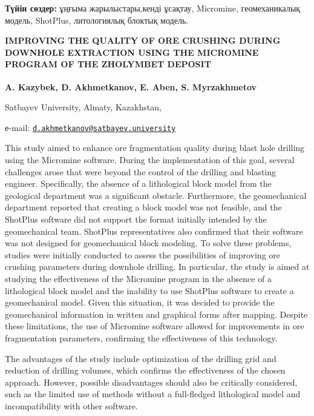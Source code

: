 {\bfseries Түйін сөздер:} ұңғыма жарылыстары,кенді ұсақтау, Micromine,
геомеханикалық модель, ShotPlus, литологиялық блоктық модель.
\begin{articleheader}

{\bfseries IMPROVING THE QUALITY OF ORE CRUSHING DURING DOWNHOLE EXTRACTION
USING THE MICROMINE PROGRAM OF THE ZHOLYMBET DEPOSIT}

{\bfseries A. Kazybek, D. Akhmetkanov\textsuperscript{\envelope }, E. Aben, S.
Myrzakhmetov}
\end{articleheader}
\begin{affiliation}

Satbayev University, Almaty, Kazakhstan,

е-mail: \href{mailto:d.akhmetkanov@satbayev.university}{\nolinkurl{d.akhmetkanov@satbayev.university}}
\end{affiliation}

This study aimed to enhance ore fragmentation quality during blast hole
drilling using the Micromine software. During the implementation of this
goal, several challenges arose that were beyond the control of the
drilling and blasting engineer. Specifically, the absence of a
lithological block model from the geological department was a
significant obstacle. Furthermore, the geomechanical department reported
that creating a block model was not feasible, and the ShotPlus software
did not support the format initially intended by the geomechanical team.
ShotPlus representatives also confirmed that their software was not
designed for geomechanical block modeling. To solve these problems,
studies were initially conducted to assess the possibilities of
improving ore crushing parameters during downhole drilling. In
particular, the study is aimed at studying the effectiveness of the
Micromine program in the absence of a lithological block model and the
inability to use ShotPlus software to create a geomechanical model.
Given this situation, it was decided to provide the geomechanical
information in written and graphical forms after mapping. Despite these
limitations, the use of Micromine software allowed for improvements in
ore fragmentation parameters, confirming the effectiveness of this
technology.

The advantages of the study include optimization of the drilling grid
and reduction of drilling volumes, which confirms the effectiveness of
the chosen approach. However, possible disadvantages should also be
critically considered, such as the limited use of methods without a
full-fledged lithological model and incompatibility with other software.

